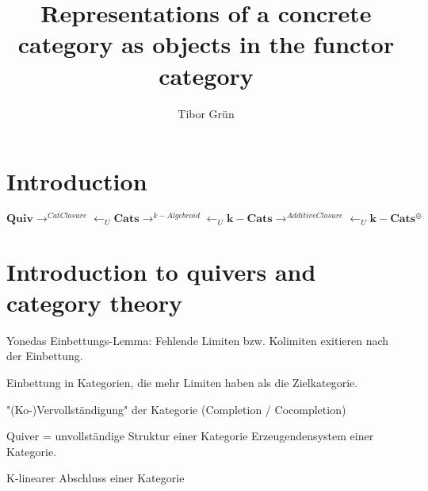 \documentclass{article}
\title{Representations of a concrete category as objects in the functor category}
\author{Tibor Gr{\"u}n}
\theoremstyle{definition}
\begin{document}

	\maketitle

	\newpage

	\tableofcontents

	\newpage


%

\section{Introduction}

\[
\mathbf{Quiv}\rightarrow^{CatClosure}\leftarrow_{U}\mathbf{Cats}
\rightarrow^{k-Algebroid}\leftarrow_{U}\mathbf{k-Cats}
\rightarrow^{AdditiveClosure}\leftarrow_{U}\mathbf{k-Cats^{\oplus}}
\]



\section{Introduction to quivers and category theory}






%

%





%



Yonedas Einbettungs-Lemma: Fehlende Limiten bzw. Kolimiten exitieren nach der Einbettung.

Einbettung in Kategorien, die mehr Limiten haben als die Zielkategorie.

"(Ko-)Vervollständigung" der Kategorie (Completion / Cocompletion)

Quiver = unvollständige Struktur einer Kategorie
Erzeugendensystem einer Kategorie.

K-linearer Abschluss einer Kategorie
\end{document}
